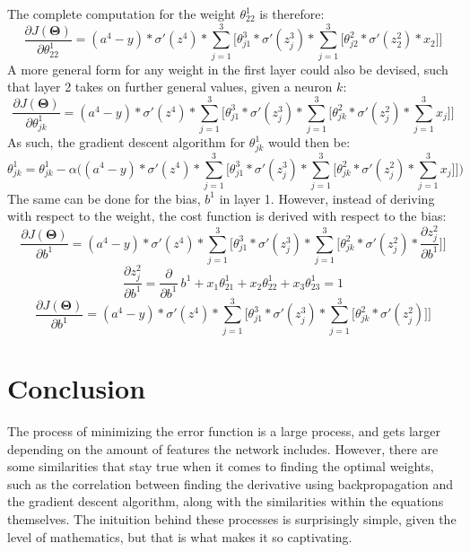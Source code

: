 \documentclass[a4paper,12pt]{article}
\begin{document}
The complete computation for the weight $\theta_{22}^1$ is therefore: 
\[\frac{\partial J(\boldsymbol{\Theta})}{\partial \theta^1_{22}} = (a^4 - y) * \sigma'(z^4) * \sum_{j=1}^3 \Big[\theta^3_{j1} * \sigma'(z^3_j) * \sum_{j=1}^{3} \Big[ \theta^2_{j2} * \sigma'(z^2_2) * x_2\Big]\Big]\]
A more general form for any weight in the first layer could also be devised, such that layer 2 takes on further general values, given a neuron $k$:
\[\frac{\partial J(\boldsymbol{\Theta})}{\partial \theta^1_{jk}} = (a^4 - y) * \sigma'(z^4) * \sum_{j=1}^3 \Big[\theta^3_{j1} * \sigma'(z^3_j) * \sum_{j=1}^{3} \Big[ \theta^2_{jk} * \sigma'(z^2_j) * \sum_{j=1}^3x_j\Big]\Big]\]
As such, the gradient descent algorithm for $\theta_{jk}^1$ would then be:
\[\theta_{jk}^1 = \theta_{jk}^1 - \alpha\Big((a^4 - y) * \sigma'(z^4) * \sum_{j=1}^3 \Big[\theta^3_{j1} * \sigma'(z^3_j) * \sum_{j=1}^{3} \Big[ \theta^2_{jk} * \sigma'(z^2_j) * \sum_{j=1}^3x_j\Big]\Big]\Big)\]
The same can be done for the bias, $b^1$ in layer 1. However, instead of deriving with respect to the weight, the cost function is derived with respect to the bias:
\[\frac{\partial J(\boldsymbol{\Theta})}{\partial b^1} = (a^4 - y) * \sigma'(z^4) * \sum_{j=1}^3 \Big[\theta^3_{j1} * \sigma'(z^3_j) * \sum_{j=1}^{3} \Big[ \theta^2_{jk} * \sigma'(z^2_j) * \frac{\partial z^2_j}{\partial b^1}\Big]\Big]\]
\[\frac{\partial z^2_j}{\partial b^1} = \frac{\partial}{\partial b^1} \ b^1 + x_1\theta_{21}^1 + x_2\theta_{22}^1 + x_3\theta^1_{23} = 1\]
\[\frac{\partial J(\boldsymbol{\Theta})}{\partial b^1} = (a^4 - y) * \sigma'(z^4) * \sum_{j=1}^3 \Big[\theta^3_{j1} * \sigma'(z^3_j) * \sum_{j=1}^{3} \Big[ \theta^2_{jk} * \sigma'(z^2_j)\Big]\Big]\]

\section{Conclusion}
The process of minimizing the error function is a large process, and gets larger depending on the amount of features the network includes. However, there are some similarities that stay true when it comes to finding the optimal weights, such as the correlation between finding the derivative using backpropagation and the gradient descent algorithm, along with the similarities within the equations themselves. The inituition behind these processes is surprisingly simple, given the level of mathematics, but that is what makes it so captivating.
\end{document}
